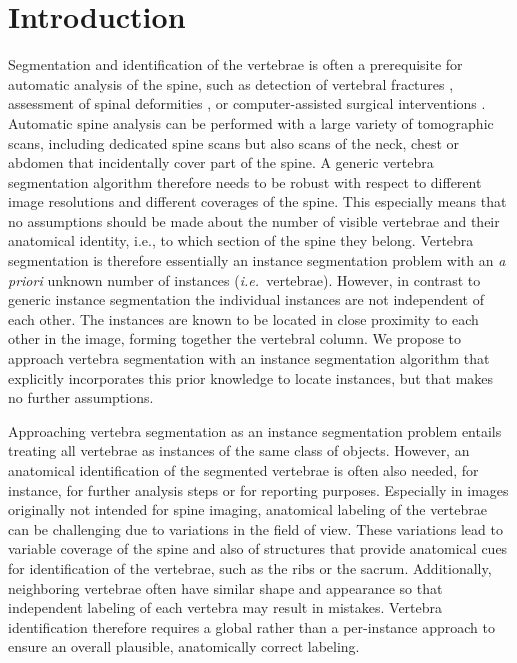 \documentclass[authoryear,5p,final,times]{elsarticle}
\begin{document}
\begin{frontmatter}
\begin{abstract}
        \end{abstract}
    \end{frontmatter}

    \section{Introduction}

    Segmentation and identification of the vertebrae is often a prerequisite for automatic analysis of the spine, such as detection of vertebral fractures \citep{Yao2012}, assessment of spinal deformities \citep{Forsberg2013}, or computer-assisted surgical interventions \citep{Knez2016}. Automatic spine analysis can be performed with a large variety of tomographic scans, including dedicated spine scans but also scans of the neck, chest or abdomen that incidentally cover part of the spine. A generic vertebra segmentation algorithm therefore needs to be robust with respect to different image resolutions and different coverages of the spine. This especially means that no assumptions should be made about the number of visible vertebrae and their anatomical identity, i.e., to which section of the spine they belong. Vertebra segmentation is therefore essentially an instance segmentation problem with an \emph{a priori} unknown number of instances (\emph{i.e.\ }vertebrae). However, in contrast to generic instance segmentation the individual instances are not independent of each other. The instances are known to be located in close proximity to each other in the image, forming together the vertebral column. We propose to approach vertebra segmentation with an instance segmentation algorithm that explicitly incorporates this prior knowledge to locate instances, but that makes no further assumptions.

    Approaching vertebra segmentation as an instance segmentation problem entails treating all vertebrae as instances of the same class of objects. However, an anatomical identification of the segmented vertebrae is often also needed, for instance, for further analysis steps or for reporting purposes. Especially in images originally not intended for spine imaging, anatomical labeling of the vertebrae can be challenging due to variations in the field of view. These variations lead to variable coverage of the spine and also of structures that provide anatomical cues for identification of the vertebrae, such as the ribs or the sacrum. Additionally, neighboring vertebrae often have similar shape and appearance so that independent labeling of each vertebra may result in mistakes. Vertebra identification therefore requires a global rather than a per-instance approach to ensure an overall plausible, anatomically correct labeling.
\end{document}
